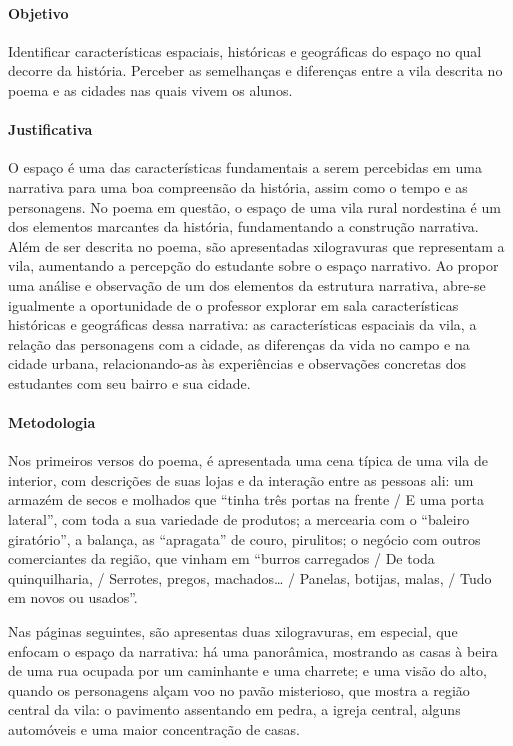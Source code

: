 \documentclass[11pt]{extarticle}
\begin{document}
\paragraph{Objetivo} Identificar características espaciais, históricas e geográficas do espaço no qual decorre da história. Perceber as semelhanças e diferenças entre a vila descrita no poema e as cidades nas quais vivem os alunos.

\paragraph{Justificativa} O espaço é uma das características fundamentais a serem percebidas em uma narrativa para uma boa compreensão da história, assim como o tempo e as personagens. No poema em questão, o espaço de uma vila rural nordestina é um dos elementos marcantes da história, fundamentando a construção narrativa. Além de ser descrita no poema, são apresentadas xilogravuras que representam a vila, aumentando a percepção do estudante sobre o espaço narrativo. Ao propor uma análise e observação de um dos elementos da estrutura narrativa, abre-se igualmente a oportunidade de o professor explorar em sala características históricas e geográficas dessa narrativa: as características espaciais da vila, a relação das personagens com a cidade, as diferenças da vida no campo e na cidade urbana, relacionando-as às experiências e observações concretas dos estudantes com seu bairro e sua cidade.

\paragraph{Metodologia} Nos primeiros versos do poema, é apresentada uma cena típica de uma vila de interior, com descrições de suas lojas e da interação entre as pessoas ali: um armazém de secos e molhados que ``tinha três portas na frente / E uma porta lateral'', com toda a sua variedade de produtos; a mercearia com o ``baleiro giratório'', a balança, as ``apragata'' de couro, pirulitos; o negócio com outros comerciantes da região, que vinham em ``burros carregados / De toda quinquilharia, / Serrotes, pregos, machados\ldots{} / 
Panelas, botijas, malas, / Tudo em novos ou usados''.

Nas páginas seguintes, são apresentas duas xilogravuras, em especial, que enfocam o espaço da narrativa: há uma panorâmica, mostrando as casas à beira de uma rua ocupada por um caminhante e uma charrete; e uma visão do alto, quando os personagens alçam voo no pavão misterioso, que mostra a região central da vila: o pavimento assentando em pedra, a igreja central, alguns automóveis e uma maior concentração de casas.
\end{document}

